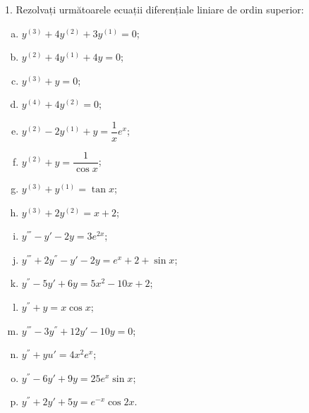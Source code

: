 1. Rezolvați următoarele ecuații diferențiale liniare de ordin superior:
\begin{enumerate}[(a)]
\item $ y^{(3)} + 4y^{(2)} + 3y^{(1)} = 0 $;
\item $ y^{(2)} + 4y^{(1)} + 4y = 0 $;
\item $ y^{(3)} + y = 0 $;
\item $ y^{(4)} + 4y^{(2)} = 0 $;
\item $ y^{(2)} - 2y^{(1)} + y = \dfrac{1}{x} e^x $;
\item $ y^{(2)} + y = \dfrac{1}{\cos x} $;
\item $ y^{(3)} + y^{(1)} = \tan x $;
\item $ y^{(3)} + 2y^{(2)} = x + 2 $;
\item $ y^{'''} - y' - 2y = 3e^{2x} $;
\item $ y^{'''} + 2y^{''} - y' - 2y = e^x + 2 + \sin x $;
\item $ y^{''} - 5y' + 6y = 5x^2 - 10x + 2 $;
\item $ y^{''} + y = x \cos x $;
\item $ y^{'''} - 3y^{''} + 12y' - 10y = 0 $;
\item $ y^{''} + yu' = 4x^2 e^x $;
\item $ y^{''} - 6y' + 9y = 25e^x \sin x $;
\item $ y^{''} + 2y' + 5y = e^{-x} \cos 2x $.
\end{enumerate}

\vspace{1cm}

